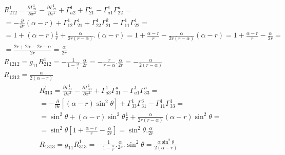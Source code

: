 \documentclass[a4paper,12pt]{article}
\begin{document}
    \begin{equation*}
        \begin{aligned}
            R^1_{212} = \frac{\partial\varGamma^1_{21}}{\partial x^2} - \frac{\partial\varGamma^1_{22}}{\partial x^1} + \varGamma^1_{a2} + \varGamma^a_{21} - \varGamma^1_{a1}\varGamma^a_{22} = \\
            = - \frac{\partial}{\partial r} (\alpha-r) + \varGamma^1_{12}\varGamma^1_{21}+\varGamma^1_{22}\varGamma^2_{21}-\varGamma^1_{11}\varGamma^1_{22} = \\
            =1 + (\alpha - r)\frac{1}{r}+\frac{\alpha}{2r(r-\alpha)}.(\alpha-r) = 1+\frac{\alpha-r}{r} - \frac{\alpha}{2r(r-\alpha)}(\alpha-r)=1+\frac{\alpha-r}{r}-\frac{\alpha}{2r} = \\
            = \frac{2r+2\alpha-2r-\alpha}{2r} = \frac{\alpha}{2r}
            \\
            R_{1212}=g_{11}R^1_{212}=-\frac{1}{1-\frac{\alpha}{r}}.\frac{\alpha}{2r}= - \frac{r}{r-\alpha}.\frac{\alpha}{2r}=-\frac{\alpha}{2(r-\alpha)} \\
            R_{1212}=\frac{\alpha}{2(\alpha-r)}
        \end{aligned}
    \end{equation*}
    \newline
    \begin{equation*}
        \begin{aligned}
            R^1_{313}=\frac{\partial\varGamma^1_{31}}{\partial x^3} - \frac{\partial\varGamma^1_{33}}{\partial x^1}+\varGamma^1_{a3}\varGamma^a_{31}-\varGamma^1_{a1}\varGamma^a_{33} = \\
            = -\frac{\partial}{\partial r} [(\alpha-r)\sin^2\theta] + \varGamma^1_{33}\varGamma^3_{31} - \varGamma^1_{11}\varGamma^1_{33} = \\
            = \sin^2\theta + (\alpha-r)\sin^2\theta\frac{1}{r} + \frac{\alpha}{2r(r-\alpha)}(\alpha-r)\sin^2\theta = \\
            = \sin^2\theta\left[ 1 + \frac{\alpha -r}{r} - \frac{\alpha}{2r} \right] = \sin^2\theta.\frac{\alpha}{2r}
            \\
            R_{1313}=g_{11}R^1_{313} = -\frac{1}{1-\frac{\alpha}{r}}.\frac{\alpha}{2r}.\sin^2\theta = \frac{\alpha\sin^2\theta}{2(\alpha-r)}
        \end{aligned}
    \end{equation*}
\end{document}

